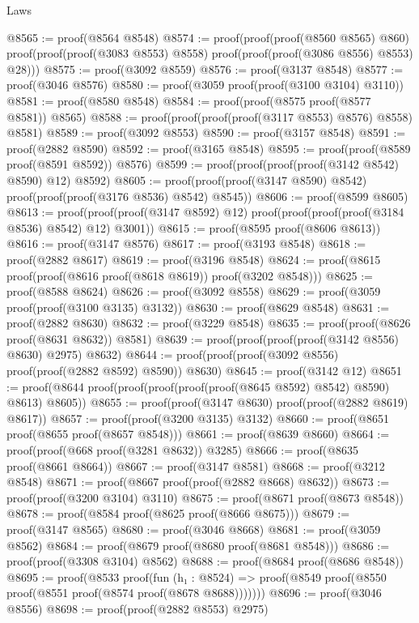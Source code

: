 \begin{lexlean}{Laws}
\begin{coremodule}
@8565 := proof(@8564 @8548)
@8574 := proof(proof(proof(@8560 @8565) @860)
      proof(proof(proof(@3083 @8553) @8558) proof(proof(proof(@3086 @8556) @8553) @28)))
@8575 := proof(@3092 @8559)
@8576 := proof(@3137 @8548)
@8577 := proof(@3046 @8576)
@8580 := proof(@3059 proof(proof(@3100 @3104) @3110))
@8581 := proof(@8580 @8548)
@8584 := proof(proof(@8575 proof(@8577 @8581)) @8565)
@8588 := proof(proof(proof(proof(@3117 @8553) @8576) @8558) @8581)
@8589 := proof(@3092 @8553)
@8590 := proof(@3157 @8548)
@8591 := proof(@2882 @8590)
@8592 := proof(@3165 @8548)
@8595 := proof(proof(@8589 proof(@8591 @8592)) @8576)
@8599 := proof(proof(proof(proof(@3142 @8542) @8590) @12) @8592)
@8605 := proof(proof(proof(@3147 @8590) @8542) proof(proof(proof(@3176 @8536) @8542) @8545))
@8606 := proof(@8599 @8605)
@8613 := proof(proof(proof(@3147 @8592) @12)
      proof(proof(proof(proof(@3184 @8536) @8542) @12) @3001))
@8615 := proof(@8595 proof(@8606 @8613))
@8616 := proof(@3147 @8576)
@8617 := proof(@3193 @8548)
@8618 := proof(@2882 @8617)
@8619 := proof(@3196 @8548)
@8624 := proof(@8615 proof(proof(@8616 proof(@8618 @8619)) proof(@3202 @8548)))
@8625 := proof(@8588 @8624)
@8626 := proof(@3092 @8558)
@8629 := proof(@3059 proof(proof(@3100 @3135) @3132))
@8630 := proof(@8629 @8548)
@8631 := proof(@2882 @8630)
@8632 := proof(@3229 @8548)
@8635 := proof(proof(@8626 proof(@8631 @8632)) @8581)
@8639 := proof(proof(proof(proof(@3142 @8556) @8630) @2975) @8632)
@8644 := proof(proof(proof(@3092 @8556) proof(proof(@2882 @8592) @8590)) @8630)
@8645 := proof(@3142 @12)
@8651 := proof(@8644 proof(proof(proof(proof(proof(@8645 @8592) @8542) @8590) @8613) @8605))
@8655 := proof(proof(@3147 @8630) proof(proof(@2882 @8619) @8617))
@8657 := proof(proof(@3200 @3135) @3132)
@8660 := proof(@8651 proof(@8655 proof(@8657 @8548)))
@8661 := proof(@8639 @8660)
@8664 := proof(proof(@668 proof(@3281 @8632)) @3285)
@8666 := proof(@8635 proof(@8661 @8664))
@8667 := proof(@3147 @8581)
@8668 := proof(@3212 @8548)
@8671 := proof(@8667 proof(proof(@2882 @8668) @8632))
@8673 := proof(proof(@3200 @3104) @3110)
@8675 := proof(@8671 proof(@8673 @8548))
@8678 := proof(@8584 proof(@8625 proof(@8666 @8675)))
@8679 := proof(@3147 @8565)
@8680 := proof(@3046 @8668)
@8681 := proof(@3059 @8562)
@8684 := proof(@8679 proof(@8680 proof(@8681 @8548)))
@8686 := proof(proof(@3308 @3104) @8562)
@8688 := proof(@8684 proof(@8686 @8548))
@8695 := proof(@8533
      proof(fun (h₁ : @8524) =>
        proof(@8549 proof(@8550 proof(@8551 proof(@8574 proof(@8678 @8688)))))))
@8696 := proof(@3046 @8556)
@8698 := proof(proof(@2882 @8553) @2975)

\end{coremodule}
\end{lexlean}
